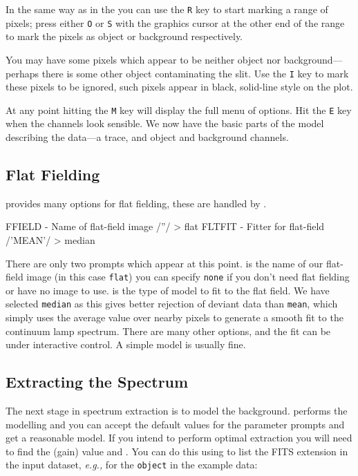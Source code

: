 \documentclass[twoside,11pt]{starlink}
\providecommand{\scspec}[2]{#1}
\begin{document}
In the same way as in the 
you can use the \verb+R+ key
to start marking a range of pixels; press either \verb+O+ or \verb+S+ with
the graphics cursor at the other end of the range to mark the pixels as
object or background respectively.

You may have some pixels which appear to be neither object nor
background\scspec{---}{ - }perhaps there is some other object contaminating
the slit.  Use the \verb+I+ key to mark these pixels to be ignored, such
pixels appear in black, solid-line style on the plot.

At any point hitting the \verb+M+ key will display the full menu of options.
Hit the \verb+E+ key when the channels look sensible.  We now have the basic
parts of the model describing the data\scspec{---}{ - }a trace, and object
and background channels.


\subsection{Flat Fielding}

provides many options for flat fielding, these are handled by
.

{
\scspec{\small}{ }
\begin{terminalv}
   FFIELD - Name of flat-field image /''/ > flat
   FLTFIT - Fitter for flat-field /'MEAN'/ > median
\end{terminalv}
}

There are only two prompts which appear at this point.
 is the name of our flat-field
image (in this case \verb+flat+) you can specify
\verb+none+ if you don't need flat fielding or have no image to use.
 is the type of model to fit
to the flat field.
We have selected \verb+median+ as this gives better rejection of deviant
data than \verb+mean+, which simply uses the average value over nearby
pixels to generate a smooth fit to the continuum lamp spectrum.
There are many other options, and the fit can be under interactive control.
A simple model is usually fine.


\subsection{Extracting the Spectrum}

The next stage in spectrum extraction is to model the background.
performs the modelling and you can accept the default values for
the parameter prompts and get a reasonable model.
If you intend to perform optimal extraction you will need to find the
 (gain) value and
\@.
You can do this using 
to list the FITS extension in the input dataset, {\it{e.g.,}}
for the \verb+object+ in the example data:
\end{document}
